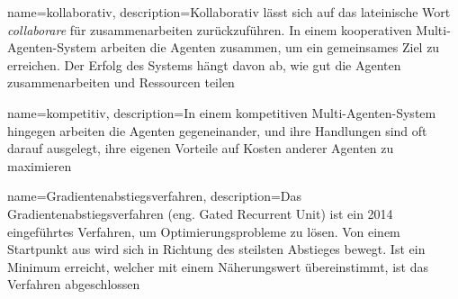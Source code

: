 {
	name=kollaborativ,
	description={Kollaborativ lässt sich auf das lateinische Wort \textit{collaborare} für zusammenarbeiten zurückzuführen. In einem kooperativen Multi-Agenten-System arbeiten die Agenten zusammen, um ein gemeinsames Ziel zu erreichen. Der Erfolg des Systems hängt davon ab, wie gut die Agenten zusammenarbeiten und Ressourcen teilen}
}

{
	name=kompetitiv,
	description={In einem kompetitiven Multi-Agenten-System hingegen arbeiten die Agenten gegeneinander, und ihre Handlungen sind oft darauf ausgelegt, ihre eigenen Vorteile auf Kosten anderer Agenten zu maximieren}
}

{
	name=Gradientenabstiegsverfahren,
	description={Das Gradientenabstiegsverfahren (eng. Gated Recurrent Unit) ist ein 2014 eingeführtes Verfahren, um Optimierungsprobleme zu lösen. Von einem Startpunkt aus wird sich in Richtung des steilsten Abstieges bewegt. Ist ein Minimum erreicht, welcher mit einem Näherungswert übereinstimmt, ist das Verfahren abgeschlossen}
}



